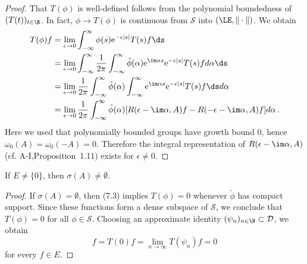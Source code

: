 \begin{proof}
That $T(\phi)$ is well-defined follows from the polynomial boundedness of $(T(t))_{t\in\R}$.
In fact, $\phi \to T(\phi)$ is continuous from $\mathcal{S}$ into $(\LE,\|\cdot\|)$.
We obtain
\begin{align*}
T(\phi)f &= \lim_{\epsilon\to 0} \int_{-\infty}^{\infty} \phi(s)\mathrm{e}^{-\epsilon|s|}T(s)f \ds \\
&= \lim_{\epsilon\to 0} \int_{-\infty}^{\infty} \frac{1}{2\pi}\int_{-\infty}^{\infty} \check{\phi}(\alpha)\mathrm{e}^{\im\alpha s}\mathrm{e}^{-\epsilon|s|}T(s)f d\alpha \ds \\
&= \lim_{\epsilon\to 0} \frac{1}{2\pi}\int_{-\infty}^{\infty} \check{\phi}(\alpha)\int_{-\infty}^{\infty} \mathrm{e}^{\im\alpha s}\mathrm{e}^{-\epsilon|s|}T(s)f \ds d\alpha \\
&= \lim_{\epsilon\to 0} \frac{1}{2\pi}\int_{-\infty}^{\infty} \check{\phi}(\alpha)[R(\epsilon-\im\alpha,A)f - R(-\epsilon-\im\alpha,A)f] d\alpha \,.
\end{align*}
Here we used that polynomially bounded groups have growth bound $0$, hence $\omega_{0}(A) = \omega_{0}(-A) = 0$.
Therefore the integral representation of $R(\epsilon-\im\alpha,A)$ (cf. A-I,Proposition~1.11) exists for $\epsilon \neq 0$.
\end{proof}
\begin{lemma}\label{lem:a3-7.6}
If $E \neq \{0\}$, then $\sigma(A) \neq \emptyset$.
\end{lemma}
\begin{proof}
If $\sigma(A) = \emptyset$, then (7.3) implies $T(\phi) = 0$ whenever $\check{\phi}$ has compact support.
Since these functions form a dense subspace of $\mathcal{S}$, we conclude that $T(\phi) = 0$ for all $\phi \in \mathcal{S}$.
Choosing an approximate identity $(\psi_{n})_{n\in\N} \subset \mathcal{D}$, we obtain
\[
f = T(0)f = \lim_{n\to\infty} T(\psi_{n})f = 0
\]
for every $f \in E$.
\end{proof}
